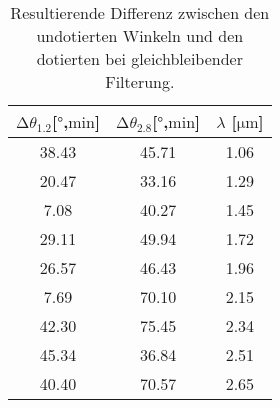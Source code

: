 \begin{table}
    \centering
    \caption{Resultierende Differenz zwischen den undotierten Winkeln und den dotierten bei gleichbleibender Filterung.}
    \label{tab:diff}
    \begin{tabular}{c c c}
    \toprule
    $\increment \theta_{1.2} $[$\si{\degree}$,$\si{\minute}$] & $\increment \theta_{2.8} $[$\si{\degree}$,$\si{\minute}$] & $\lambda$ [$\si{\micro\meter}$] \\
    \midrule
    38.43 & 45.71 & 1.06 \\
    20.47 & 33.16 & 1.29\\
    7.08 & 40.27 & 1.45\\
    29.11 & 49.94 & 1.72\\
    26.57 & 46.43 & 1.96\\
    7.69 & 70.10 & 2.15\\
    42.30 & 75.45 & 2.34\\
    45.34 & 36.84 & 2.51\\
    40.40 & 70.57 & 2.65\\
    \end{tabular}
\end{table}
